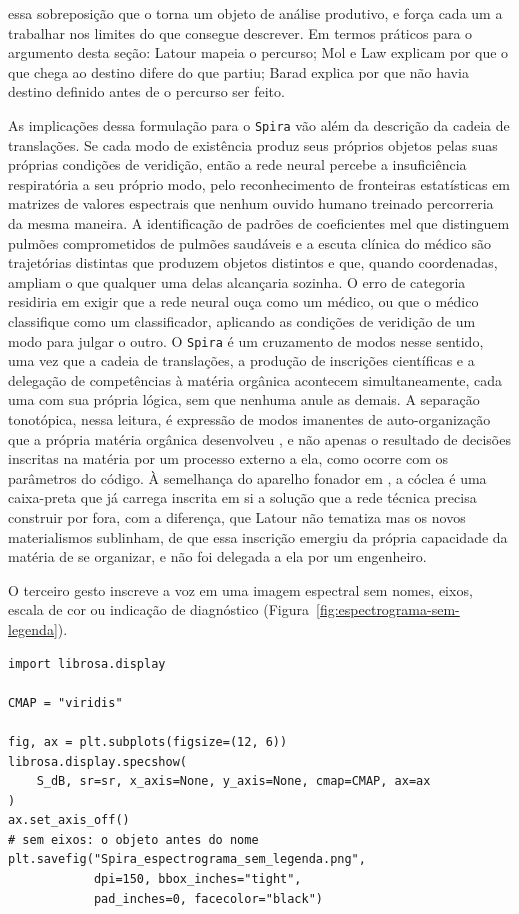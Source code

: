essa sobreposição que o torna um objeto de análise produtivo, e força cada um a trabalhar nos limites do que consegue descrever. Em termos práticos para o argumento desta seção: Latour mapeia o percurso; Mol e Law explicam por que o que chega ao destino difere do que partiu; Barad explica por que não havia destino definido antes de o percurso ser feito.

As implicações dessa formulação para o \texttt{Spira} vão além da descrição da cadeia de translações. Se cada modo de existência produz seus próprios objetos pelas suas próprias condições de veridição, então a rede neural percebe a insuficiência respiratória a seu próprio modo, pelo reconhecimento de fronteiras estatísticas em matrizes de valores espectrais que nenhum ouvido humano treinado percorreria da mesma maneira. A identificação de padrões de coeficientes mel que distinguem pulmões comprometidos de pulmões saudáveis e a escuta clínica do médico são trajetórias distintas que produzem objetos distintos e que, quando coordenadas, ampliam o que qualquer uma delas alcançaria sozinha. O erro de categoria residiria em exigir que a rede neural ouça como um médico, ou que o médico classifique como um classificador, aplicando as condições de veridição de um modo para julgar o outro. O \texttt{Spira} é um cruzamento de modos nesse sentido, uma vez que a cadeia de translações, a produção de inscrições científicas e a delegação de competências à matéria orgânica acontecem simultaneamente, cada uma com sua própria lógica, sem que nenhuma anule as demais. A separação tonotópica, nessa leitura, é expressão de modos imanentes de auto-organização que a própria matéria orgânica desenvolveu \parencite[pp.~9--10]{CooleFrost2010}, e não apenas o resultado de decisões inscritas na matéria por um processo externo a ela, como ocorre com os parâmetros do código. À semelhança do aparelho fonador em \parencite{Latour2008Powers}, a cóclea é uma caixa-preta que já carrega inscrita em si a solução que a rede técnica precisa construir por fora, com a diferença, que Latour não tematiza mas os novos materialismos sublinham, de que essa inscrição emergiu da própria capacidade da matéria de se organizar, e não foi delegada a ela por um engenheiro.

O terceiro gesto inscreve a voz em uma imagem espectral sem nomes, eixos, escala de cor ou indicação de diagnóstico (Figura~\ref{fig:espectrograma-sem-legenda}).

\begin{lstlisting}[caption={A textura espectral antes de qualquer nomeação (resultado na Figura~\ref{fig:espectrograma-sem-legenda}).}]
import librosa.display

CMAP = "viridis"

fig, ax = plt.subplots(figsize=(12, 6))
librosa.display.specshow(
    S_dB, sr=sr, x_axis=None, y_axis=None, cmap=CMAP, ax=ax
)
ax.set_axis_off()
# sem eixos: o objeto antes do nome
plt.savefig("Spira_espectrograma_sem_legenda.png",
            dpi=150, bbox_inches="tight",
            pad_inches=0, facecolor="black")
\end{lstlisting}

